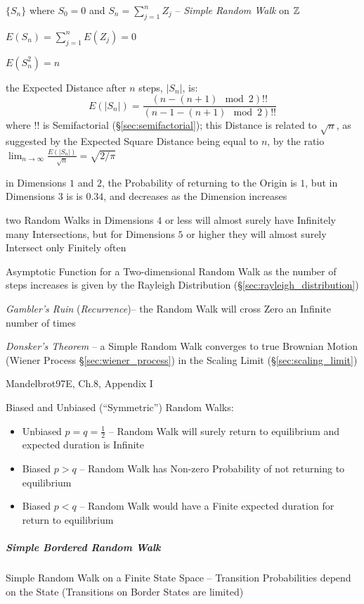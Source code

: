 $\{ S_n \}$ where $S_0 = 0$ and $S_n = \sum_{j=1}^n Z_j$ --
\emph{Simple Random Walk} on $\mathbb{Z}$

$E(S_n) = \sum_{j=1}^n E(Z_j) = 0$

$E(S_n^2) = n$

the Expected Distance after $n$ steps, $|S_n|$, is:
\[
  E(|S_n|) = \frac{(n - (n+1)\mod{2})!!}{(n - 1 - (n+1)\mod{2})!!}
\]
where $!!$ is Semifactorial (\S\ref{sec:semifactorial}); this Distance is
related to $\sqrt{n}$, as suggested by the Expected Square Distance being equal
to $n$, by the ratio
$\lim_{n\to\infty} \frac{E(|S_n|)}{\sqrt{n}} = \sqrt{2/\pi}$

in Dimensions $1$ and $2$, the Probability of returning to the Origin is $1$,
but in Dimensions $3$ is is $0.34$, and decreases as the Dimension increases

two Random Walks in Dimensions $4$ or less will almost surely have Infinitely
many Intersections, but for Dimensions $5$ or higher they will almost surely
Intersect only Finitely often

Asymptotic Function for a Two-dimensional Random Walk as the number of steps
increases is given by the Rayleigh Distribution
(\S\ref{sec:rayleigh_distribution})

\emph{Gambler's Ruin} (\emph{Recurrence})-- the Random Walk will cross Zero an
Infinite number of times

\emph{Donsker's Theorem} -- a Simple Random Walk converges to true Brownian
Motion (Wiener Process \S\ref{sec:wiener_process}) in the Scaling Limit
(\S\ref{sec:scaling_limit})

\asterism

Mandelbrot97E, Ch.8, Appendix I

Biased and Unbiased (``Symmetric'') Random Walks:
\begin{itemize}
  \item Unbiased $p = q = \frac{1}{2}$ -- Random Walk will surely return to
    equilibrium and expected duration is Infinite
  \item Biased $p > q$ -- Random Walk has Non-zero Probability of not returning
    to equilibrium
  \item Biased $p < q$ -- Random Walk would have a Finite expected duration for
    return to equilibrium
\end{itemize}



\subparagraph{Simple Bordered Random Walk}\label{sec:simple_bordered_walk}\hfill

Simple Random Walk on a Finite State Space -- Transition Probabilities depend on
the State (Transitions on Border States are limited)



